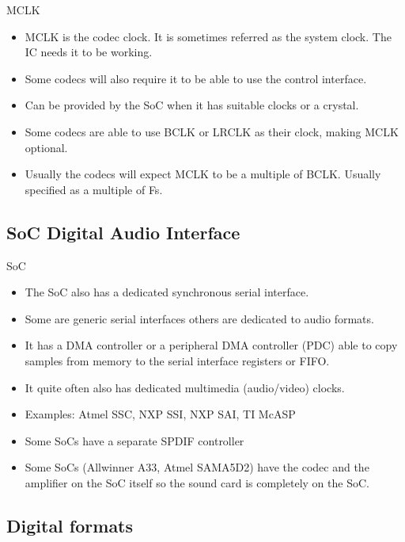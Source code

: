 \begin{frame}{MCLK}
  \begin{itemize}
  \item MCLK is the codec clock. It is sometimes referred as the
    system clock. The IC needs it to be working.
  \item Some codecs will also require it to be able to use the
    control interface.
  \item Can be provided by the SoC when it has suitable clocks or a
    crystal.
  \item Some codecs are able to use BCLK or LRCLK as their clock,
    making MCLK optional.
  \item Usually the codecs will expect MCLK to be a multiple of BCLK.
    Usually specified as a multiple of Fs.
  \end{itemize}
\end{frame}

\subsection{SoC Digital Audio Interface}

\begin{frame}{SoC}
  \begin{itemize}
  \item The SoC also has a dedicated synchronous serial interface.
  \item Some are generic serial interfaces others are dedicated to audio
    formats.
  \item It has a DMA controller or a peripheral DMA controller (PDC)
    able to copy samples from memory to the serial interface registers
    or FIFO.
  \item It quite often also has dedicated multimedia (audio/video) clocks.
  \item Examples: Atmel SSC, NXP SSI, NXP SAI, TI McASP
  \item Some SoCs have a separate SPDIF controller
  \item Some SoCs (Allwinner A33, Atmel SAMA5D2) have the codec and
    the amplifier on the SoC itself so the sound card is completely on
    the SoC.
  \end{itemize}
\end{frame}

\subsection{Digital formats}

